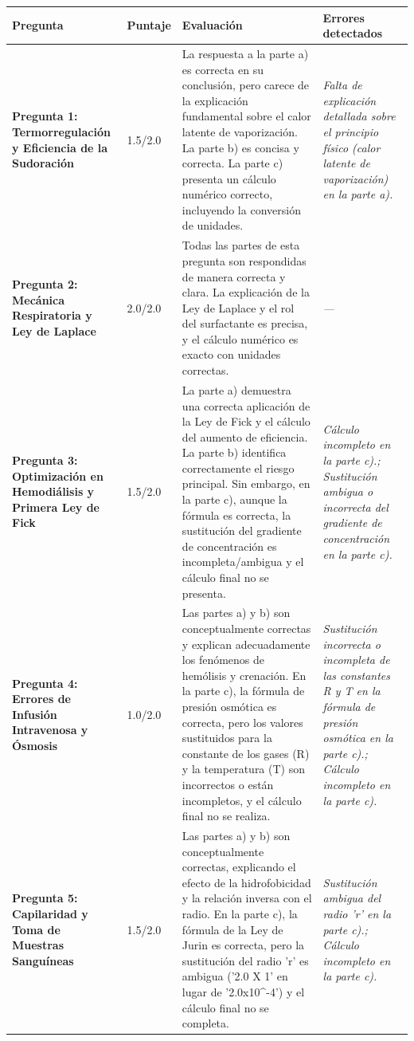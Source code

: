\documentclass[11pt,a4paper]{article}
\begin{document}
\begin{longtable}{>{\bfseries}p{2.8cm} p{1.6cm} p{7.0cm} p{2.8cm}}
  \toprule
  \textbf{Pregunta} & \textbf{Puntaje} & \textbf{Evaluación} & \textbf{Errores detectados} \\
  \midrule
  \endhead
  \bottomrule
  \endfoot
    \textbf{Pregunta 1: Termorregulación y Eficiencia de la Sudoración} & 1.5/2.0 & La respuesta a la parte a) es correcta en su conclusión, pero carece de la explicación fundamental sobre el calor latente de vaporización. La parte b) es concisa y correcta. La parte c) presenta un cálculo numérico correcto, incluyendo la conversión de unidades. & \textit{Falta de explicación detallada sobre el principio físico (calor latente de vaporización) en la parte a).} \\
    \midrule
    \textbf{Pregunta 2: Mecánica Respiratoria y Ley de Laplace} & 2.0/2.0 & Todas las partes de esta pregunta son respondidas de manera correcta y clara. La explicación de la Ley de Laplace y el rol del surfactante es precisa, y el cálculo numérico es exacto con unidades correctas. & \textit{---} \\
    \midrule
    \textbf{Pregunta 3: Optimización en Hemodiálisis y Primera Ley de Fick} & 1.5/2.0 & La parte a) demuestra una correcta aplicación de la Ley de Fick y el cálculo del aumento de eficiencia. La parte b) identifica correctamente el riesgo principal. Sin embargo, en la parte c), aunque la fórmula es correcta, la sustitución del gradiente de concentración es incompleta/ambigua y el cálculo final no se presenta. & \textit{Cálculo incompleto en la parte c).; Sustitución ambigua o incorrecta del gradiente de concentración en la parte c).} \\
    \midrule
    \textbf{Pregunta 4: Errores de Infusión Intravenosa y Ósmosis} & 1.0/2.0 & Las partes a) y b) son conceptualmente correctas y explican adecuadamente los fenómenos de hemólisis y crenación. En la parte c), la fórmula de presión osmótica es correcta, pero los valores sustituidos para la constante de los gases (R) y la temperatura (T) son incorrectos o están incompletos, y el cálculo final no se realiza. & \textit{Sustitución incorrecta o incompleta de las constantes R y T en la fórmula de presión osmótica en la parte c).; Cálculo incompleto en la parte c).} \\
    \midrule
    \textbf{Pregunta 5: Capilaridad y Toma de Muestras Sanguíneas} & 1.5/2.0 & Las partes a) y b) son conceptualmente correctas, explicando el efecto de la hidrofobicidad y la relación inversa con el radio. En la parte c), la fórmula de la Ley de Jurin es correcta, pero la sustitución del radio 'r' es ambigua ('2.0 X 1' en lugar de '2.0x10\textasciicircum{}-4') y el cálculo final no se completa. & \textit{Sustitución ambigua del radio 'r' en la parte c).; Cálculo incompleto en la parte c).} \\
    \midrule
\end{longtable}
\end{document}
